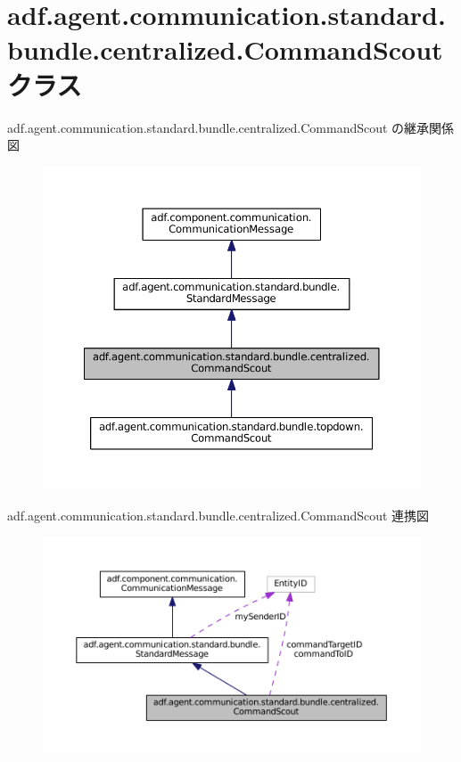 \hypertarget{classadf_1_1agent_1_1communication_1_1standard_1_1bundle_1_1centralized_1_1CommandScout}{}\section{adf.\+agent.\+communication.\+standard.\+bundle.\+centralized.\+Command\+Scout クラス}
\label{classadf_1_1agent_1_1communication_1_1standard_1_1bundle_1_1centralized_1_1CommandScout}


adf.\+agent.\+communication.\+standard.\+bundle.\+centralized.\+Command\+Scout の継承関係図
\nopagebreak
\begin{figure}[H]
\begin{center}
\leavevmode
\includegraphics[width=350pt]{classadf_1_1agent_1_1communication_1_1standard_1_1bundle_1_1centralized_1_1CommandScout__inherit__graph}
\end{center}
\end{figure}


adf.\+agent.\+communication.\+standard.\+bundle.\+centralized.\+Command\+Scout 連携図
\nopagebreak
\begin{figure}[H]
\begin{center}
\leavevmode
\includegraphics[width=350pt]{classadf_1_1agent_1_1communication_1_1standard_1_1bundle_1_1centralized_1_1CommandScout__coll__graph}
\end{center}
\end{figure}
